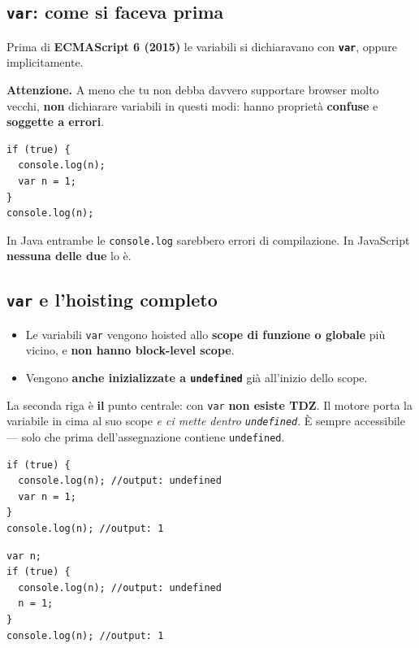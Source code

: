 \documentclass[10pt,a4paper]{article}
\newcommand{\avviso}[1]{\textbf{\textcolor{wamber}{Attenzione.}} #1}
\begin{document}
\subsection{\texttt{var}: come si faceva prima}

Prima di \textbf{ECMAScript 6 (2015)} le variabili si dichiaravano con \textbf{\texttt{var}}, oppure implicitamente.

\begin{warnbox}
\avviso{A meno che tu non debba davvero supportare browser molto vecchi, \textbf{non} dichiarare variabili in questi modi: hanno proprietà \textbf{confuse} e \textbf{soggette a errori}.}
\end{warnbox}

\begin{lstlisting}[style=js]
if (true) {
  console.log(n);
  var n = 1;
}
console.log(n);
\end{lstlisting}

In Java entrambe le \texttt{console.log} sarebbero errori di compilazione. In JavaScript \textbf{nessuna delle due} lo è.

\subsection{\texttt{var} e l'hoisting completo}

\begin{itemize}
  \item Le variabili \texttt{var} vengono hoisted allo \textbf{scope di funzione o globale} più vicino, e \textbf{non hanno block-level scope}.
  \item Vengono \textbf{anche inizializzate a \texttt{undefined}} già all'inizio dello scope.
\end{itemize}

La seconda riga è \textbf{il} punto centrale: con \texttt{var} \textbf{non esiste TDZ}. Il motore porta la variabile in cima al suo scope \emph{e ci mette dentro \texttt{undefined}}. È sempre accessibile --- solo che prima dell'assegnazione contiene \texttt{undefined}.

\begin{lstlisting}[style=js]
if (true) {
  console.log(n); //output: undefined
  var n = 1;
}
console.log(n); //output: 1
\end{lstlisting}

\begin{lstlisting}[style=js]
var n;
if (true) {
  console.log(n); //output: undefined
  n = 1;
}
console.log(n); //output: 1
\end{lstlisting}
\end{document}
